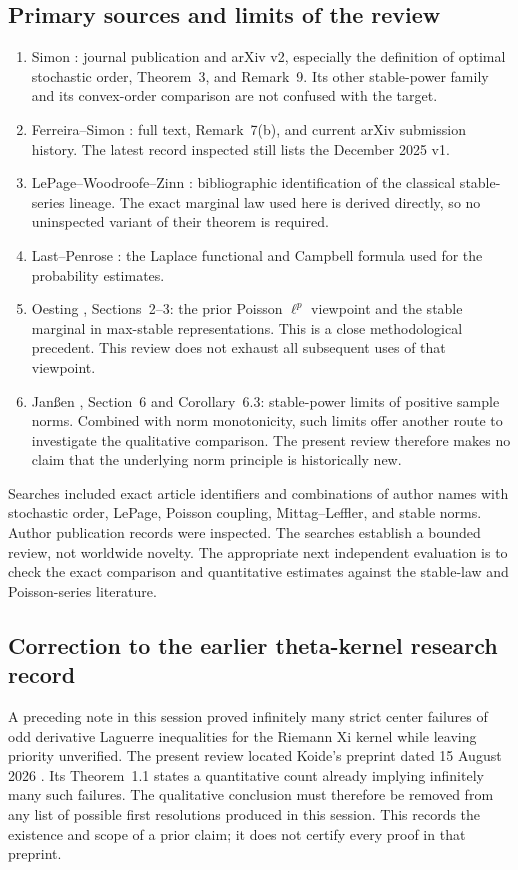 \documentclass[11pt,a4paper]{article}
\begin{document}
\subsection{Primary sources and limits of the review}
\begin{enumerate}
\item Simon \cite{Simon}: journal publication and arXiv v2,
especially the definition of optimal stochastic order,
Theorem~3, and Remark~9. Its other stable-power family and
its convex-order comparison are not confused with the target.
\item Ferreira--Simon \cite{FS}: full text, Remark~7(b), and
current arXiv submission history. The latest record inspected
still lists the December 2025 v1.
\item LePage--Woodroofe--Zinn \cite{LWZ}: bibliographic identification
of the classical stable-series lineage. The exact marginal law
used here is derived directly, so no uninspected variant of
their theorem is required.
\item Last--Penrose \cite{LP}: the Laplace functional and Campbell
formula used for the probability estimates.
\item Oesting \cite{Oesting}, Sections~2--3: the prior Poisson
\(\ell^p\) viewpoint and the stable marginal in max-stable
representations. This is a close methodological precedent.
This review does not exhaust all subsequent uses of that viewpoint.
\item Jan\ss en \cite{Janssen}, Section~6 and Corollary~6.3:
stable-power limits of positive sample norms. Combined with norm
monotonicity, such limits offer another route to investigate the
qualitative comparison. The present review therefore makes no claim
that the underlying norm principle is historically new.
\end{enumerate}
Searches included exact article identifiers and combinations of
author names with stochastic order, LePage, Poisson coupling,
Mittag--Leffler, and stable norms. Author publication records
were inspected. The searches establish a bounded review, not
worldwide novelty. The appropriate next independent evaluation
is to check the exact comparison and quantitative estimates
against the stable-law and Poisson-series literature.

\subsection{Correction to the earlier theta-kernel research record}
A preceding note in this session proved infinitely many strict
center failures of odd derivative Laguerre inequalities for the
Riemann Xi kernel while leaving priority unverified. The present
review located Koide's preprint dated 15 August 2026 \cite{Koide}.
Its Theorem~1.1 states a quantitative count already implying
infinitely many such failures. The qualitative conclusion must
therefore be removed from any list of possible first resolutions
produced in this session. This records the existence and scope
of a prior claim; it does not certify every proof in that preprint.
\end{document}
